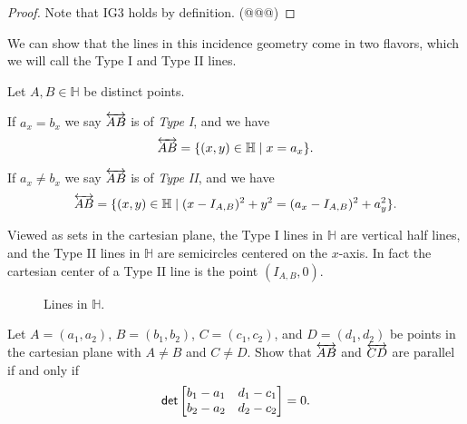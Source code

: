\begin{proof}
Note that IG3 holds by definition. (@@@)
\end{proof}

We can show that the lines in this incidence geometry come in two flavors, which we will call the Type I and Type II lines.

\begin{cor}
Let \(A, B \in \mathbb{H}\) be distinct points.
\begin{proplist}
\item If \(a_x = b_x\) we say \(\overleftrightarrow{AB}\) is of \emph{Type I}, and we have \[ \overleftrightarrow{AB} = \{ (x,y) \in \mathbb{H} \mid x = a_x \}. \]
\item If \(a_x \neq b_x\) we say \(\overleftrightarrow{AB}\) is of \emph{Type II}, and we have \[ \overleftrightarrow{AB} = \{ (x,y) \in \mathbb{H} \mid (x - I_{A,B})^2 + y^2 = (a_x - I_{A,B})^2 + a_y^2 \}. \]
\end{proplist}
\end{cor}

Viewed as sets in the cartesian plane, the Type I lines in \(\mathbb{H}\) are vertical half lines, and the Type II lines in \(\mathbb{H}\) are semicircles centered on the \(x\)-axis.
In fact the cartesian center of a Type II line is the point \((I_{A,B},0)\).

\begin{figure}[h]
\begin{center}
\caption{\label{fig:lines-in-hyp-half-plane}Lines in \(\mathbb{H}\).}
\end{center}
\end{figure}



\Exercises%

\begin{exercise} \label{exerc:parallels-in-rr2}
Let \(A = (a_1,a_2)\), \(B = (b_1,b_2)\), \(C = (c_1,c_2)\), and \(D = (d_1,d_2)\) be points in the cartesian plane with \(A \neq B\) and \(C \neq D\).
Show that \(\overleftrightarrow{AB}\) and \(\overleftrightarrow{CD}\) are parallel if and only if \[ \mathsf{det} \begin{bmatrix} b_1 - a_1 & d_1 - c_1 \\ b_2 - a_2 & d_2 - c_2 \end{bmatrix} = 0. \]
\end{exercise}


